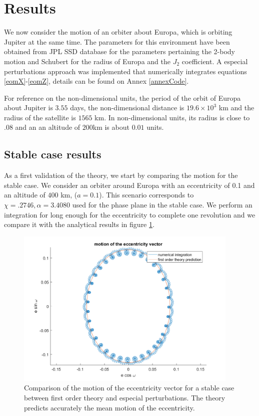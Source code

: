 \section{Results}

We now consider the motion of an orbiter about Europa, which is orbiting Jupiter at the same time. The parameters for this environment have been obtained from JPL SSD database \cite{jplssd} for the parameters pertaining the 2-body motion and Schubert \cite{schubert2004interior} for the radius of Europa and the $J_2$ coefficient. A especial perturbations approach was implemented that numerically integrates equations \ref{eomX}-\ref{eomZ}, details can be found on Annex \ref{annexCode}.

For reference on the non-dimensional units, the period of the orbit of Europa about Jupiter is $3.55$ days, the non-dimensional distance is $19.6 \times 10^3$ km and the radius of the satellite is $1565$ km. In non-dimensional units, its radius is close to $.08$ and an an altitude of $200$km is about $0.01$ units.

\subsection{Stable case results}
As a first validation of the theory, we start by comparing the motion for the stable case. We consider an orbiter around Europa with an eccentricity of 0.1 and an altitude of $400$ km, ($a=0.1$). This scenario corresponds to $\chi = .2746, \alpha = 3.4080$ used for the phase plane in the stable case. We perform an integration for long enough for the eccentricity to complete one revolution and we compare it with the analytical results in figure \ref{fig:stableEccentricityComparison}.

\begin{figure}[H]
	\centering
	\includegraphics[height=3in]
	{figures/Europe400km01e30i/eccentricityComparison.png}
	\caption{Comparison of the motion of the eccentricity vector for a stable case between first order theory and especial perturbations. The theory predicts accurately the mean motion of the eccentricity.}
	\label{fig:stableEccentricityComparison}
\end{figure}

